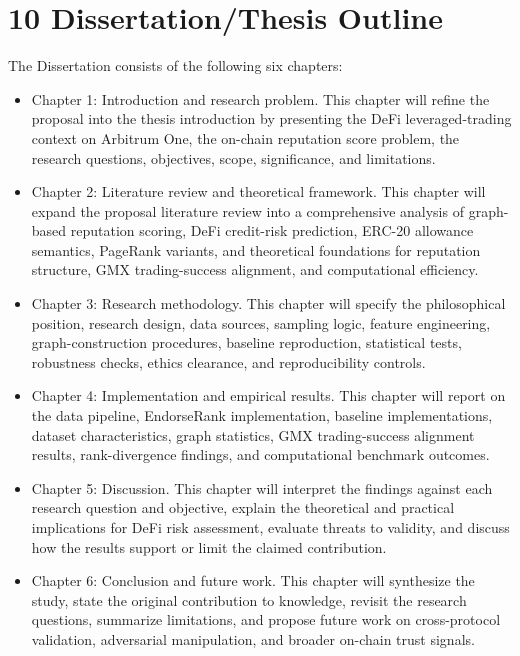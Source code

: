 \clearpage
{}
\section*{10 \textbf{Dissertation/Thesis Outline}}
\label{sec:dissertationthesis-outline}

The Dissertation consists of the following six chapters:


\begin{itemize}
\item[\textendash] Chapter 1: Introduction and research problem. This chapter will refine the proposal into the thesis introduction by presenting the DeFi leveraged-trading context on Arbitrum One, the on-chain reputation score problem, the research questions, objectives, scope, significance, and limitations.
\item[\textendash] Chapter 2: Literature review and theoretical framework. This chapter will expand the proposal literature review into a comprehensive analysis of graph-based reputation scoring, DeFi credit-risk prediction, ERC-20 allowance semantics, PageRank variants, and theoretical foundations for reputation structure, GMX trading-success alignment, and computational efficiency.
\item[\textendash] Chapter 3: Research methodology. This chapter will specify the philosophical position, research design, data sources, sampling logic, feature engineering, graph-construction procedures, baseline reproduction, statistical tests, robustness checks, ethics clearance, and reproducibility controls.
\item[\textendash] Chapter 4: Implementation and empirical results. This chapter will report on the data pipeline, EndorseRank implementation, baseline implementations, dataset characteristics, graph statistics, GMX trading-success alignment results, rank-divergence findings, and computational benchmark outcomes.
\item[\textendash] Chapter 5: Discussion. This chapter will interpret the findings against each research question and objective, explain the theoretical and practical implications for DeFi risk assessment, evaluate threats to validity, and discuss how the results support or limit the claimed contribution.
\item[\textendash] Chapter 6: Conclusion and future work. This chapter will synthesize the study, state the original contribution to knowledge, revisit the research questions, summarize limitations, and propose future work on cross-protocol validation, adversarial manipulation, and broader on-chain trust signals.
\end{itemize}
